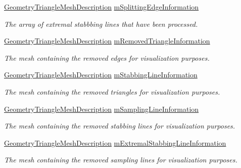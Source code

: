 \begin{DoxyCompactItemize}
\mbox{\hyperlink{structvisilib_1_1_geometry_triangle_mesh_description}{Geometry\+Triangle\+Mesh\+Description}} \mbox{\hyperlink{classvisilib_1_1_helper_visual_debugger_ad728baaee2934cbade4b9f987a19de36}{m\+Splitting\+Edge\+Information}}
\begin{DoxyCompactList}\small\item\em The array of extremal stabbbing lines that have been processed. \end{DoxyCompactList}\item 
\mbox{\hyperlink{structvisilib_1_1_geometry_triangle_mesh_description}{Geometry\+Triangle\+Mesh\+Description}} \mbox{\hyperlink{classvisilib_1_1_helper_visual_debugger_ac9be4c9101138a3133835729a7226428}{m\+Removed\+Triangle\+Information}}
\begin{DoxyCompactList}\small\item\em The mesh containing the removed edges for visualization purposes. \end{DoxyCompactList}\item 
\mbox{\hyperlink{structvisilib_1_1_geometry_triangle_mesh_description}{Geometry\+Triangle\+Mesh\+Description}} \mbox{\hyperlink{classvisilib_1_1_helper_visual_debugger_ac5bc178cf799f6b894b26fe2cc9e20a2}{m\+Stabbing\+Line\+Information}}
\begin{DoxyCompactList}\small\item\em The mesh containing the removed triangles for visualization purposes. \end{DoxyCompactList}\item 
\mbox{\hyperlink{structvisilib_1_1_geometry_triangle_mesh_description}{Geometry\+Triangle\+Mesh\+Description}} \mbox{\hyperlink{classvisilib_1_1_helper_visual_debugger_ad4d6c94e916f2cceb8fb0534dad8b07f}{m\+Sampling\+Line\+Information}}
\begin{DoxyCompactList}\small\item\em The mesh containing the removed stabbing lines for visualization purposes. \end{DoxyCompactList}\item 
\mbox{\hyperlink{structvisilib_1_1_geometry_triangle_mesh_description}{Geometry\+Triangle\+Mesh\+Description}} \mbox{\hyperlink{classvisilib_1_1_helper_visual_debugger_a7bc0c408a8a6da48b78bb203c1f0bb27}{m\+Extremal\+Stabbing\+Line\+Information}}
\begin{DoxyCompactList}\small\item\em The mesh containing the removed sampling lines for visualization purposes. \end{DoxyCompactList}\end{DoxyCompactItemize}


